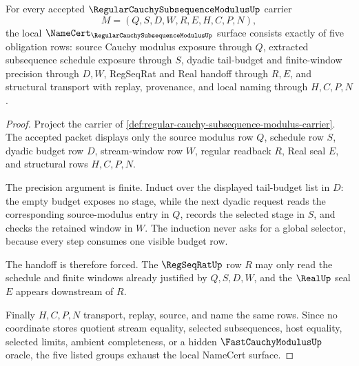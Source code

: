 \begin{theorem}
\label{thm:regular-cauchy-subsequence-modulus-namecert-surface}
For every accepted $\RegularCauchySubsequenceModulusUp$ carrier
$$
M=(Q,S,D,W,R,E,H,C,P,N),
$$
the local $\NameCert_{\RegularCauchySubsequenceModulusUp}$ surface consists exactly of five obligation rows: source Cauchy modulus exposure through $Q$, extracted subsequence schedule exposure through $S$, dyadic tail-budget and finite-window precision through $D,W$, RegSeqRat and Real handoff through $R,E$, and structural transport with replay, provenance, and local naming through $H,C,P,N$.
\end{theorem}
\begin{proof}
Project the carrier of \autoref{def:regular-cauchy-subsequence-modulus-carrier}. The accepted packet displays only the source modulus row $Q$, schedule row $S$, dyadic budget row $D$, stream-window row $W$, regular readback $R$, Real seal $E$, and structural rows $H,C,P,N$.

The precision argument is finite. Induct over the displayed tail-budget list in $D$: the empty budget exposes no stage, while the next dyadic request reads the corresponding source-modulus entry in $Q$, records the selected stage in $S$, and checks the retained window in $W$. The induction never asks for a global selector, because every step consumes one visible budget row.

The handoff is therefore forced. The $\RegSeqRatUp$ row $R$ may only read the schedule and finite windows already justified by $Q,S,D,W$, and the $\RealUp$ seal $E$ appears downstream of $R$.

Finally $H,C,P,N$ transport, replay, source, and name the same rows. Since no coordinate stores quotient stream equality, selected subsequences, host equality, selected limits, ambient completeness, or a hidden $\FastCauchyModulusUp$ oracle, the five listed groups exhaust the local NameCert surface.
\end{proof}



